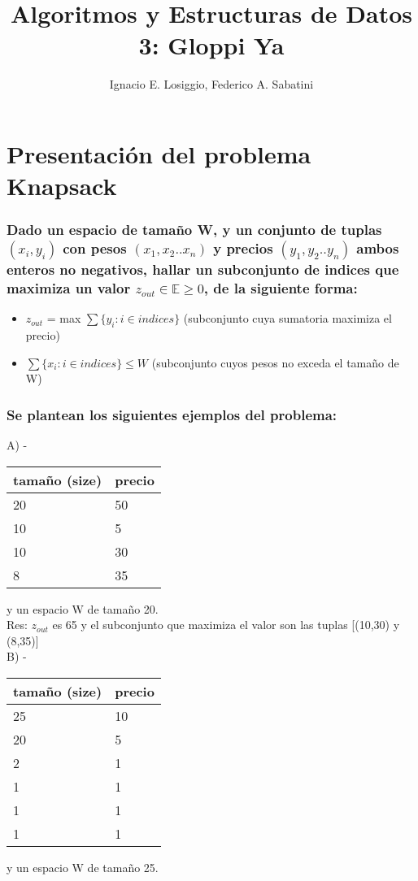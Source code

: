 \documentclass[fleqn, 11pt]{article}
\title{Algoritmos y Estructuras de Datos 3: Gloppi Ya}
\author{Ignacio E. Losiggio, Federico A. Sabatini}
\begin{document}
\maketitle
\section{Presentación del problema Knapsack} 

\subsubsection{Dado un espacio de tamaño W, y un conjunto de tuplas $(x_i,y_i)$ con pesos $(x_1,x_2..x_n)$ y precios $(y_1,y_2..y_n)$ ambos enteros no negativos,
hallar un subconjunto de indices que maximiza un valor $z_{out} \in\mathbb{E} \geq 0$, de la siguiente forma:}

\begin{itemize}
	\item $z_{out} $ = max $\sum \{ y_i : i \in indices \} $ (subconjunto cuya sumatoria maximiza el precio)
	\item $\sum \{ x_i : i \in indices \} \le W $ (subconjunto cuyos pesos no exceda el tamaño de W)
\end{itemize}

\subsubsection{Se plantean los siguientes ejemplos del problema:}

A) - 
\begin{tabular}{l l}
	tamaño (size) & precio \\ \toprule
    20 & 50 \\
    10 & 5  \\
    10 & 30 \\
    8 & 35  \\
\end{tabular}
y un espacio W de tamaño 20. \\

Res: $z_{out}$ es 65 y el subconjunto que maximiza el valor son las tuplas [(10,30) y (8,35)] \\

B) - 
\begin{tabular}{l l}
	tamaño (size) & precio \\ \toprule
    25 & 10 \\
    20 & 5 \\
    2  & 1 \\
    1  & 1 \\
    1  & 1 \\
    1  & 1 \\
\end{tabular}
y un espacio W de tamaño 25. \\
\end{document}

